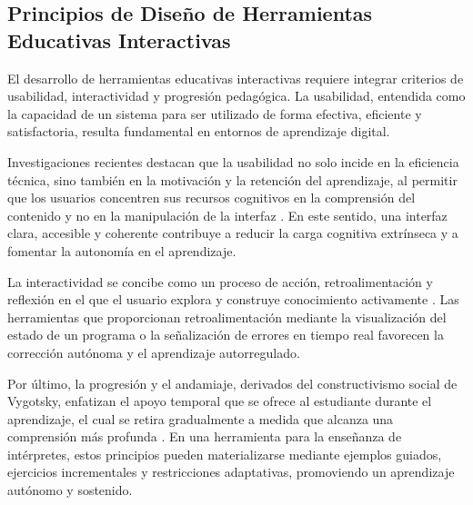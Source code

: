 \subsection{Principios de Diseño de Herramientas Educativas Interactivas}

El desarrollo de herramientas educativas interactivas requiere integrar criterios de usabilidad, interactividad y progresión pedagógica. La usabilidad, entendida como la capacidad de un sistema para ser utilizado de forma efectiva, eficiente y satisfactoria, resulta fundamental en entornos de aprendizaje digital. 

Investigaciones recientes destacan que la usabilidad no solo incide en la eficiencia técnica, sino también en la motivación y la retención del aprendizaje, al permitir que los usuarios concentren sus recursos cognitivos en la comprensión del contenido y no en la manipulación de la interfaz \cite{lu2022usability}. En este sentido, una interfaz clara, accesible y coherente contribuye a reducir la carga cognitiva extrínseca y a fomentar la autonomía en el aprendizaje.

La interactividad se concibe como un proceso de acción, retroalimentación y reflexión en el que el usuario explora y construye conocimiento activamente \cite{hernandez2022aprendizaje}. Las herramientas que proporcionan retroalimentación mediante la visualización del estado de un programa o la señalización de errores en tiempo real favorecen la corrección autónoma y el aprendizaje autorregulado.

Por último, la progresión y el andamiaje, derivados del constructivismo social de Vygotsky, enfatizan el apoyo temporal que se ofrece al estudiante durante el aprendizaje, el cual se retira gradualmente a medida que alcanza una comprensión más profunda \cite{benitez2023constructivismo}. En una herramienta para la enseñanza de intérpretes, estos principios pueden materializarse mediante ejemplos guiados, ejercicios incrementales y restricciones adaptativas, promoviendo un aprendizaje autónomo y sostenido.





